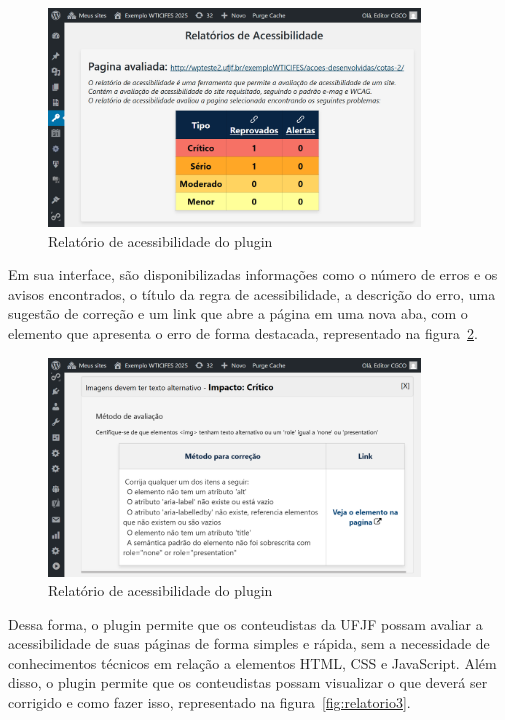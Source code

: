 \documentclass[
    12pt,
    a4paper,
    oneside,
    brazil,
    english
]{article}
\begin{document}
\begin{figure}[ht]
  \centering
  \caption{Relatório de acessibilidade do plugin}
  \label{fig:relatorio}
  \includegraphics[width=0.88\textwidth]{imagem2.png}
\end{figure}


Em sua interface, são disponibilizadas informações
como o número de erros e os avisos encontrados,
o título da regra de acessibilidade, a descrição do erro, uma sugestão de correção
e um link que abre a página em uma nova aba, com o elemento que apresenta o erro de
forma destacada, representado na figura~\ref{fig:relatorio2}.

\begin{figure}[ht]
  \centering
  \caption{Relatório de acessibilidade do plugin}
  \label{fig:relatorio2}
  \includegraphics[width=0.88\textwidth]{imagem3.png}
\end{figure}

Dessa forma, o plugin permite que os conteudistas da UFJF possam avaliar a
acessibilidade de suas páginas de forma simples e rápida, sem a necessidade
de conhecimentos técnicos em relação a elementos HTML, CSS e JavaScript.
Além disso, o plugin permite que os conteudistas possam visualizar o que
deverá ser corrigido e como fazer isso, representado na figura~\ref{fig:relatorio3}.
\end{document}
